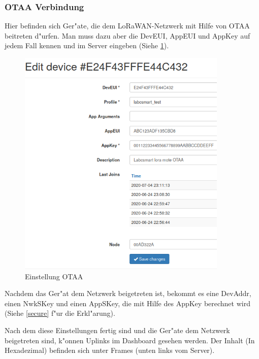 \subsubsection{OTAA Verbindung}
Hier befinden sich Ger"ate, die dem LoRaWAN-Netzwerk mit Hilfe von OTAA beitreten d"urfen. Man muss dazu aber die DevEUI, AppEUI und AppKey auf jedem Fall kennen und im Server eingeben (Siehe \ref{fig:otaa}). 
	\begin{figure}[h]
	\centering
	\includegraphics[width=10cm]{source/images/Labcsmart_otaa_gen}
	\caption{Einstellung OTAA\label{fig:otaa}}
\end{figure}
Nachdem das Ger"at dem Netzwerk beigetreten ist, bekommt es eine DevAddr, einen NwkSKey und einen AppSKey, die mit Hilfe des AppKey berechnet wird (Siehe \ref{secure} f"ur die Erkl"arung). 
\vspace{10cm}

Nach dem diese Einstellungen fertig sind und die Ger"ate dem Netzwerk beigetreten sind, k"onnen Uplinks im Dashboard gesehen werden. Der Inhalt (In Hexadezimal) befinden sich unter Frames (unten links vom Server). 

